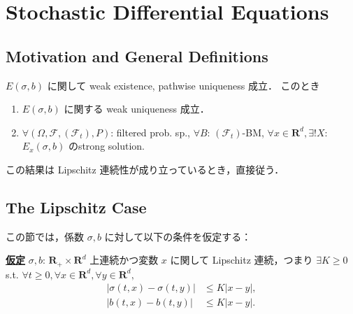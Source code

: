 \documentclass{jsarticle}
\title{}
\author{}
\date{
}
\begin{document}
\setcounter{section}{7}
\section{Stochastic Differential Equations}
\subsection{Motivation and General Definitions}

\begin{screen}
    \begin{thm*}
        $E(\sigma, b)$ に関して weak existence, pathwise uniqueness 成立．
        このとき
        \begin{enumerate}[label=(\roman*)]
            \item
            $E(\sigma, b)$ に関する weak uniqueness 成立．
            \item
            $\forall (\Omega, \mathcal{F}, (\mathcal{F}_t), P)$: filtered prob. sp., $\forall B$: $(\mathcal{F}_t)$-BM, $\forall x\in\mathbf{R}^d, \exists! X$: $E_x(\sigma, b)$ のstrong solution.
        \end{enumerate}
    \end{thm*}
\end{screen}

この結果は Lipschitz 連続性が成り立っているとき，直接従う．

\subsection{The Lipschitz Case}

この節では，係数 $\sigma, b$ に対して以下の条件を仮定する：
\begin{screen}
    \textbf{\underline{仮定} }
    $\sigma, b$: $\mathbf{R_+}\times\mathbf{R}^d$ 上連続かつ変数 $x$ に関して Lipschitz 連続，つまり $\exists K\ge0$ s.t. $\forall t\ge0, \forall x\in\mathbf{R}^d, \forall y\in\mathbf{R}^d,$
    \begin{align}
        \left\lvert\sigma(t, x)-\sigma(t, y)\right\rvert
        &\le K\left\lvert x-y\right\rvert, \\
        \left\lvert b(t, x)-b(t, y)\right\rvert
        &\le K\left\lvert x-y\right\rvert.
    \end{align}
\end{screen}
\end{document}
